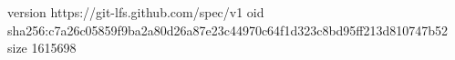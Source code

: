 version https://git-lfs.github.com/spec/v1
oid sha256:c7a26c05859f9ba2a80d26a87e23c44970c64f1d323c8bd95ff213d810747b52
size 1615698
